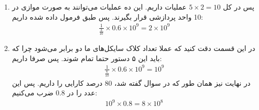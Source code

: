 \begin{enumerate}
    \item پس در کل $5 \times 2 = 10$ عملیات داریم. این ده عملیات می‌توانند به صورت موازی در 10 واحد پردازشی قرار بگیرند.
    پس طبق فرمول داده شده داریم:
    \begin{gather*}
        \frac{1}{\frac{3}{10}} \times 0.6 \times 10^9 = 2 \times 10^9
    \end{gather*}
    \item در این قسمت دقت کنید که عملا تعداد کلاک سایکل‌های ما دو برابر می‌شود چرا که باید این ۵ دستور حتما تمام شوند.
    پس صرفا داریم:
    \begin{gather*}
        \frac{1}{\frac{6}{10}} \times 0.6 \times 10^9 = 10^9
    \end{gather*}
    در نهایت نیز همان طور که در سوال گفته شد، 80 درصد کارایی را داریم. پس این عدد را در 0.8 ضرب می‌کنیم:
    \begin{gather*}
        10^9 \times 0.8 = 8 \times 10^8
    \end{gather*}
\end{enumerate}